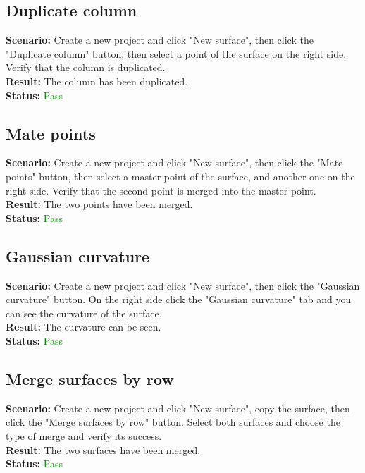 \documentclass[a4paper, 11pt, article]{report}
\begin{document}
\subsection{Duplicate column}

\noindent \textbf{Scenario:} Create a new project and click "New surface", then click the "Duplicate column" button, then select a point of the surface on the right side. Verify that the column is duplicated.
\\
\noindent \textbf{Result:} The column has been duplicated.
\\
\noindent \textbf{Status:} \textcolor{green}{Pass}

\subsection{Mate points}

\noindent \textbf{Scenario:} Create a new project and click "New surface", then click the "Mate points" button, then select a master point of the surface, and another one on the right side. Verify that the second point is merged into the master point.
\\
\noindent \textbf{Result:} The two points have been merged.
\\
\noindent \textbf{Status:} \textcolor{green}{Pass}

\subsection{Gaussian curvature}

\noindent \textbf{Scenario:} Create a new project and click "New surface", then click the "Gaussian curvature" button. On the right side click the "Gaussian curvature" tab and you can see the curvature of the surface.
\\
\noindent \textbf{Result:} The curvature can be seen.
\\
\noindent \textbf{Status:} \textcolor{green}{Pass}

\subsection{Merge surfaces by row}

\noindent \textbf{Scenario:} Create a new project and click "New surface", copy the surface, then click the "Merge surfaces by row" button. Select both surfaces and choose the type of merge and verify its success.
\\
\noindent \textbf{Result:} The two surfaces have been merged.
\\
\noindent \textbf{Status:} \textcolor{green}{Pass}
\end{document}
